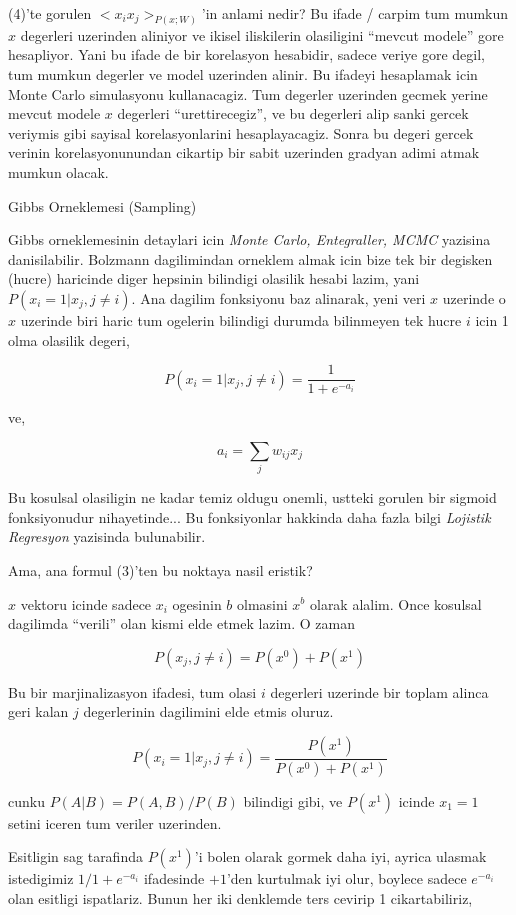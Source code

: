 \documentclass[12pt,fleqn]{article}\usepackage{../common}
\begin{document}
(4)'te gorulen $<x_ix_j>_{P(x;W)}$'in anlami nedir? Bu ifade / carpim tum
mumkun $x$ degerleri uzerinden aliniyor ve ikisel iliskilerin olasiligini
``mevcut modele'' gore hesapliyor. Yani bu ifade de bir korelasyon
hesabidir, sadece veriye gore degil, tum mumkun degerler ve model uzerinden
alinir. Bu ifadeyi hesaplamak icin Monte Carlo simulasyonu
kullanacagiz. Tum degerler uzerinden gecmek yerine mevcut modele $x$
degerleri ``urettirecegiz'', ve bu degerleri alip sanki gercek veriymis
gibi sayisal korelasyonlarini hesaplayacagiz. Sonra bu degeri gercek
verinin korelasyonunundan cikartip bir sabit uzerinden gradyan adimi atmak
mumkun olacak. 

Gibbs Orneklemesi (Sampling)

Gibbs orneklemesinin detaylari icin {\em Monte Carlo, Entegraller, MCMC}
yazisina danisilabilir. Bolzmann dagilimindan orneklem almak icin bize tek
bir degisken (hucre) haricinde diger hepsinin bilindigi olasilik hesabi
lazim, yani $P(x_i = 1 | x_j, j \ne i)$.  Ana dagilim fonksiyonu baz
alinarak, yeni veri $x$ uzerinde o $x$ uzerinde biri haric tum ogelerin
bilindigi durumda bilinmeyen tek hucre $i$ icin 1 olma olasilik degeri,

$$ P(x_i = 1 | x_j, j \ne i) = \frac{1}{1 + e^{-a_i}} $$

ve,

$$ a_i = \sum_j  w_{ij}x_j $$

Bu kosulsal olasiligin ne kadar temiz oldugu onemli, ustteki gorulen bir
sigmoid fonksiyonudur nihayetinde... Bu fonksiyonlar hakkinda daha fazla
bilgi {\em Lojistik Regresyon} yazisinda bulunabilir. 

Ama, ana formul (3)'ten bu noktaya nasil eristik?

$x$ vektoru icinde sadece $x_i$ ogesinin $b$ olmasini $x^b$ olarak
alalim. Once kosulsal dagilimda ``verili'' olan kismi elde etmek lazim. O
zaman

$$ P(x_j,j \ne i) = P(x^0) + P(x^1) $$

Bu bir marjinalizasyon ifadesi, tum olasi $i$ degerleri uzerinde bir toplam
alinca geri kalan $j$ degerlerinin dagilimini elde etmis oluruz. 

$$  P(x_i = 1 | x_j,j \ne i)  = \frac{P(x^1)}{P(x^0) + P(x^1)} $$

cunku $P(A|B) = P(A,B) / P(B)$ bilindigi gibi, ve $P(x^1)$ icinde $x_1=1$
setini iceren tum veriler uzerinden. 

Esitligin sag tarafinda $P(x^1)$'i bolen olarak gormek daha iyi, ayrica
ulasmak istedigimiz $1/1 + e^{-a_i}$ ifadesinde $+1$'den kurtulmak iyi
olur, boylece sadece $e^{-a_i}$ olan esitligi ispatlariz. Bunun her iki
denklemde ters cevirip 1 cikartabiliriz,
\end{document}
